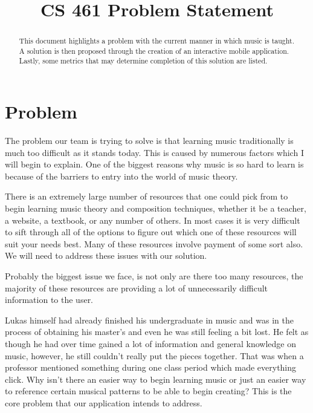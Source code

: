 \documentclass[10pt,letterpaper,draftclsnofoot,onecolumn]{IEEEtran}
\begin{document}

\begin{titlepage}
\title{CS 461 Problem Statement}
\author
{
}
    \maketitle
    \vspace{2cm}
    \begin{abstract}
        \noindent This document highlights a problem with the current manner in which music is taught. A solution is then proposed through the creation of an interactive mobile application. Lastly, some metrics that may determine completion of this solution are listed.
    \end{abstract}

\end{titlepage}

\section{Problem}
\noindent The problem our team is trying to solve is that learning music traditionally is much too difficult as it stands today. This is caused by numerous factors which I will begin to explain. One of the biggest reasons why music is so hard to learn is because of the barriers to entry into the world of music theory. 

There is an extremely large number of resources that one could pick from to begin learning music theory and composition techniques, whether it be a teacher, a website, a textbook, or any number of others. In most cases it is very difficult to sift through all of the options to figure out which one of these resources will suit your needs best. Many of these resources involve payment of some sort also. We will need to address these issues with our solution.

Probably the biggest issue we face, is not only are there too many resources, the majority of these resources are providing a lot of unnecessarily difficult information to the user. 

Lukas himself had already finished his undergraduate in music and was in the process of obtaining his master's and even he was still feeling a bit lost. He felt as though he had over time gained a lot of information and general knowledge on music, however, he still couldn't really put the pieces together. That was when a professor mentioned something during one class period which made everything click. Why isn’t there an easier way to begin learning music or just an easier way to reference certain musical patterns to be able to begin creating? This is the core problem that our application intends to address.
\end{document}
